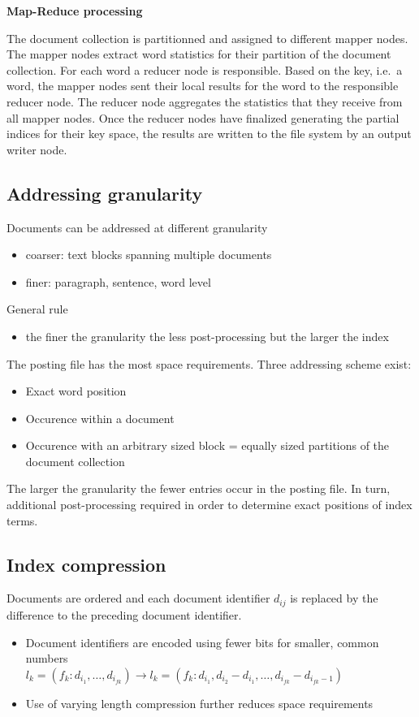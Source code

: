 \textbf{Map-Reduce processing}

The document collection is partitionned and assigned to different
mapper nodes. The mapper nodes extract word statistics for their
partition of the document collection. For each word a reducer node is
responsible. Based on the key, i.e.\, a word, the mapper nodes sent
their local results for the word to the responsible reducer node. The
reducer node aggregates the statistics that they receive from all
mapper nodes. Once the reducer nodes have finalized generating the
partial indices for their key space, the results are written to the
file system by an output writer node.

\subsection{Addressing granularity}

Documents can be addressed at different granularity
\begin{itemize}
\item coarser: text blocks spanning multiple documents
\item finer: paragraph, sentence, word level
\end{itemize}

General rule
\begin{itemize}
\item the finer the granularity the less post-processing but the
  larger the index
\end{itemize}

The posting file has the most space requirements. Three addressing
scheme exist:
\begin{itemize}
\item Exact word position
\item Occurence within a document
\item Occurence with an arbitrary sized block = equally sized
  partitions of the document collection
\end{itemize}

The larger the granularity the fewer entries occur in the posting
file. In turn, additional post-processing required in order to
determine exact positions of index terms.

\subsection{Index compression}

Documents are ordered and each document identifier $ d_{ij} $ is
replaced by the difference to the preceding document identifier.
\begin{itemize}
\item Document identifiers are encoded using fewer bits for smaller,
  common numbers \\
  $ l_k = (f_k : d_{i_1}, \ldots, d_{i_{fk}}) \rightarrow
  l_k = (f_k : d_{i_1}, d_{i_2} - d_{i_1}, \ldots, d_{i_{fk}} -
  d_{i_{fk} - 1}) $
  \item Use of varying length compression further reduces space
    requirements
\end{itemize}

